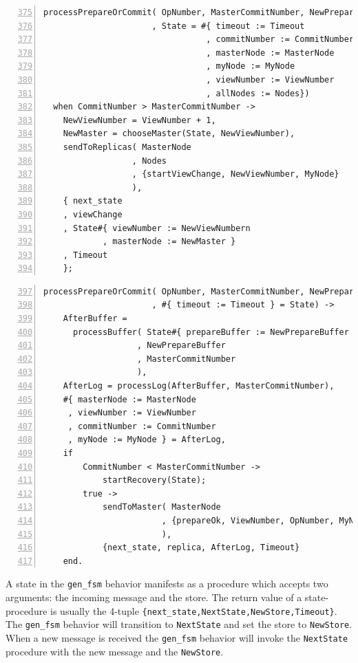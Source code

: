 \documentclass[10pt,letter]{article}
\begin{document}
\begin{lstlisting}[float,caption={Processing the VR Message Queue, Part 1 --- \texttt{vr.erl}},
                   label=lst:processing1, numbers=left, firstnumber=375]
processPrepareOrCommit( OpNumber, MasterCommitNumber, NewPrepareBuffer
                      , State = #{ timeout := Timeout
                                 , commitNumber := CommitNumber
                                 , masterNode := MasterNode
                                 , myNode := MyNode
                                 , viewNumber := ViewNumber
                                 , allNodes := Nodes})
  when CommitNumber > MasterCommitNumber ->
    NewViewNumber = ViewNumber + 1,
    NewMaster = chooseMaster(State, NewViewNumber),
    sendToReplicas( MasterNode
                  , Nodes
                  , {startViewChange, NewViewNumber, MyNode}
                  ),
    { next_state
    , viewChange
    , State#{ viewNumber := NewViewNumbern
            , masterNode := NewMaster }
    , Timeout
    };
\end{lstlisting}
\begin{lstlisting}[float,caption={Processing the VR Message Queue, Part 2 --- \texttt{vr.erl}},
                   label=lst:processing2, numbers=left, firstnumber=397]
processPrepareOrCommit( OpNumber, MasterCommitNumber, NewPrepareBuffer
                      , #{ timeout := Timeout } = State) ->
    AfterBuffer =
      processBuffer( State#{ prepareBuffer := NewPrepareBuffer }
                   , NewPrepareBuffer
                   , MasterCommitNumber
                   ),
    AfterLog = processLog(AfterBuffer, MasterCommitNumber),
    #{ masterNode := MasterNode
     , viewNumber := ViewNumber
     , commitNumber := CommitNumber
     , myNode := MyNode } = AfterLog,
    if
        CommitNumber < MasterCommitNumber ->
            startRecovery(State);
        true ->
            sendToMaster( MasterNode
                        , {prepareOk, ViewNumber, OpNumber, MyNode}
                        ),
            {next_state, replica, AfterLog, Timeout}
    end.
\end{lstlisting}

A state in the \texttt{gen\_fsm} behavior manifests as a procedure which accepts
two arguments: the incoming message and the store. The return value of a
state-procedure is usually the 4-tuple
\lstinline!{next_state,NextState,NewStore,Timeout}!. The \texttt{gen\_fsm}
behavior will transition to \lstinline!NextState! and set the store to
\lstinline!NewStore!. When a new message is received the \texttt{gen\_fsm}
behavior will invoke the \lstinline!NextState! procedure with the new message
and the \lstinline!NewStore!.
\end{document}
